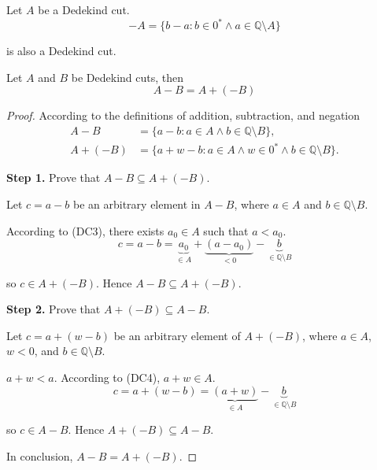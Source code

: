 \begin{theorem}
    \par Let $A$ be a Dedekind cut.
    \[
        -A = \{ b - a : b\in{0}^{*} \wedge a\in\mathbb{Q}\setminus A \}
    \]
    \par is also a Dedekind cut.
\end{theorem}

\begin{theorem}
    \par Let $A$ and $B$ be Dedekind cuts, then
    \[
        A - B = A + (-B)
    \]
\end{theorem}

\begin{proof}
    \par According to the definitions of addition, subtraction, and negation
    \begin{align*}
        A - B    & = \{ a - b : a\in A\land b\in\mathbb{Q}\setminus B \},                      \\
        A + (-B) & = \{ a + w - b : a\in A\land w\in{0}^{*}\land b\in\mathbb{Q}\setminus B \}.
    \end{align*}
    \par\textbf{Step 1.} Prove that $A - B\subseteq A + (-B)$.
    \par Let $c = a - b$ be an arbitrary element in $A - B$, where $a\in A$ and $b\in\mathbb{Q}\setminus B$.
    \par According to (DC3), there exists $a_{0}\in A$ such that $a < a_{0}$.
    \[
        c = a - b = \underbrace{a_{0}}_{\in A} + \underbrace{(a - a_{0})}_{< 0} - \underbrace{b}_{\in\mathbb{Q}\setminus B}
    \]
    \par so $c\in A + (-B)$. Hence $A - B\subseteq A + (-B)$.
    \bigskip
    \par\textbf{Step 2.} Prove that $A + (-B)\subseteq A - B$.
    \par Let $c = a + (w - b)$ be an arbitrary element of $A + (-B)$, where $a\in A$, $w < 0$, and $b\in\mathbb{Q}\setminus B$.
    \par $a + w < a$. According to (DC4), $a + w\in A$.
    \[
        c = a + (w - b) = \underbrace{(a + w)}_{\in A} - \underbrace{b}_{\in\mathbb{Q}\setminus B}
    \]
    \par so $c\in A - B$. Hence $A + (-B)\subseteq A - B$.
    \bigskip
    \par In conclusion, $A - B = A + (-B)$.
\end{proof}


